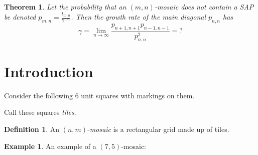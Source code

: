 \documentclass[12pt]{article}
\newtheorem{theorem}{Theorem}
\theoremstyle{plain}
\theoremstyle{definition}
\newtheorem{definition}{Definition}[section]
\theoremstyle{remark}
\theoremstyle{definition}
\newtheorem{exmp}{Example}[section]
\newcommand{\cellA}[4]{\draw[red, thick, densely dotted] ( #1 + 0.5 , #2 ) arc(0:90:{0.5}); \draw[thick] ( #1 , #2 ) rectangle ( #3 , #4 );}
\newcommand{\cellB}[4]{\draw[red, thick, densely dotted] ( #1 + 1 , #2 + 0.5 ) arc(90:180:{0.5}); \draw[thick] ( #1 , #2 ) rectangle ( #3 , #4 );}
\newcommand{\cellC}[4]{\draw[red, thick, densely dotted] ( #1 + 0.5, #2 + 1 ) arc(180:270:{0.5}); \draw[thick] ( #1 , #2 ) rectangle ( #3 , #4 );}
\newcommand{\cellD}[4]{\draw[red, thick, densely dotted] ( #1 , #2 + 0.5 ) arc(-90:0:{0.5}); \draw[thick] ( #1 , #2 ) rectangle ( #3 , #4 );}
\newcommand{\cellE}[4]{\draw[red, thick, densely dotted] (#3, #4 * 0.5 + #2 * 0.5) -- (#1, #4 * 0.5 + #2 * 0.5); \draw[thick] ( #1 , #2 ) rectangle ( #3 , #4 );}
\newcommand{\cellF}[4]{\draw[red, thick, densely dotted] (#3 * 0.5 + #1 * 0.5 , #2) -- (#3 * 0.5 + #1 * 0.5 , #4); \draw[thick] ( #1 , #2 ) rectangle ( #3 , #4 );}
\begin{document}
\begin{theorem}
    \label{thm: growth rate}    
    Let the probability that an $(m,n)$-mosaic \textit{does not} contain a SAP be denoted $p_{m,n} = \frac{t_{m,n}}{7^{nm}}$. Then the growth rate of the main diagonal $p_{n,n}$ has
    $$\gamma = \lim_{n \to \infty} \frac{p_{n+1,n+1}p_{n-1,n-1}}{p_{n,n}^2} = ?$$
\end{theorem}


\section{Introduction}

Consider the following $6$ unit squares with markings on them.

\begin{center}
\end{center}

Call these squares \textit{tiles}. 

\begin{definition}
An $(n,m)$-\textit{mosaic} is a rectangular grid made up of tiles.
\end{definition}

\begin{exmp}
An example of a $(7,5)$-mosaic:
\begin{center}
\end{center}
\end{exmp}
\end{document}

